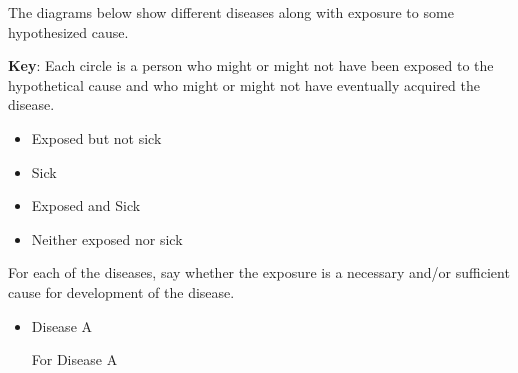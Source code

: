 \providecommand{\Person}[1]{
\draw[ultra thick] (#1) circle (.4cm);
}
\providecommand{\Exposed}[1]{
\draw[ultra thick,fill=gray!50] (#1) circle (.4cm);
}
\providecommand{\Sick}[1]{
\draw[ultra thick] (#1) -- +(.25,.25);
\draw[ultra thick] (#1) -- +(.25,-.25);
\draw[ultra thick] (#1) -- +(-.25,-.25);
\draw[ultra thick] (#1) -- +(-.25,.25);
}
\providecommand{\PersonSick}[1]{
\Person{#1}
\Sick{#1}
}
\providecommand{\ExposedSick}[1]{
\Exposed{#1}
\Sick{#1}
}

The diagrams below show different diseases along with exposure to
some hypothesized cause.  

{\bf Key}: Each circle is a person who might or might not have been exposed to the hypothetical cause and who might or might not have eventually acquired the disease.
\begin{itemize}
\item Exposed but not sick 
\item Sick 
\item Exposed and Sick 
\item Neither exposed nor sick 
\end{itemize}


For each of the diseases, say whether the
exposure is a necessary and/or sufficient cause for development of the disease.

\begin{itemize}
\item Disease A


For Disease A
\begin{MultipleChoice}[itemname=nec-and-suff-a]
\end{MultipleChoice}

\end{itemize}

